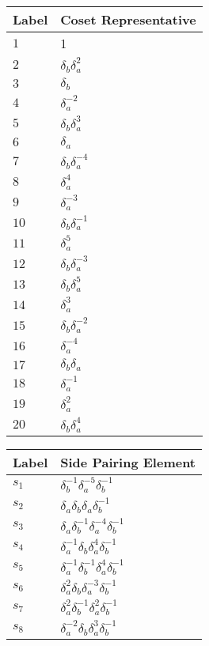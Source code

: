\documentclass{article}
\begin{document}
\begin{center}
\begin{tabular}{ll}
\toprule
Label & Coset Representative\\
\midrule
$1$ & 1 \\
$2$ & $\delta_b^{}\delta_a^{2}$ \\
$3$ & $\delta_b^{}$ \\
$4$ & $\delta_a^{-2}$ \\
$5$ & $\delta_b^{}\delta_a^{3}$ \\
$6$ & $\delta_a^{}$ \\
$7$ & $\delta_b^{}\delta_a^{-4}$ \\
$8$ & $\delta_a^{4}$ \\
$9$ & $\delta_a^{-3}$ \\
$10$ & $\delta_b^{}\delta_a^{-1}$ \\
$11$ & $\delta_a^{5}$ \\
$12$ & $\delta_b^{}\delta_a^{-3}$ \\
$13$ & $\delta_b^{}\delta_a^{5}$ \\
$14$ & $\delta_a^{3}$ \\
$15$ & $\delta_b^{}\delta_a^{-2}$ \\
$16$ & $\delta_a^{-4}$ \\
$17$ & $\delta_b^{}\delta_a^{}$ \\
$18$ & $\delta_a^{-1}$ \\
$19$ & $\delta_a^{2}$ \\
$20$ & $\delta_b^{}\delta_a^{4}$ \\
\bottomrule
\end{tabular}
\hfill
\begin{tabular}{ll}
\toprule
Label & Side Pairing Element\\
\midrule
$s_{1}$ & $\delta_b^{-1}\delta_a^{-5}\delta_b^{-1}$ \\
$s_{2}$ & $\delta_a^{}\delta_b^{}\delta_a^{}\delta_b^{-1}$ \\
$s_{3}$ & $\delta_a^{}\delta_b^{-1}\delta_a^{-4}\delta_b^{-1}$ \\
$s_{4}$ & $\delta_a^{-1}\delta_b^{}\delta_a^{4}\delta_b^{-1}$ \\
$s_{5}$ & $\delta_a^{-1}\delta_b^{-1}\delta_a^{4}\delta_b^{-1}$ \\
$s_{6}$ & $\delta_a^{2}\delta_b^{}\delta_a^{-3}\delta_b^{-1}$ \\
$s_{7}$ & $\delta_a^{2}\delta_b^{-1}\delta_a^{2}\delta_b^{-1}$ \\
$s_{8}$ & $\delta_a^{-2}\delta_b^{}\delta_a^{3}\delta_b^{-1}$ \\

\end{tabular}
\end{center}
\end{document}
